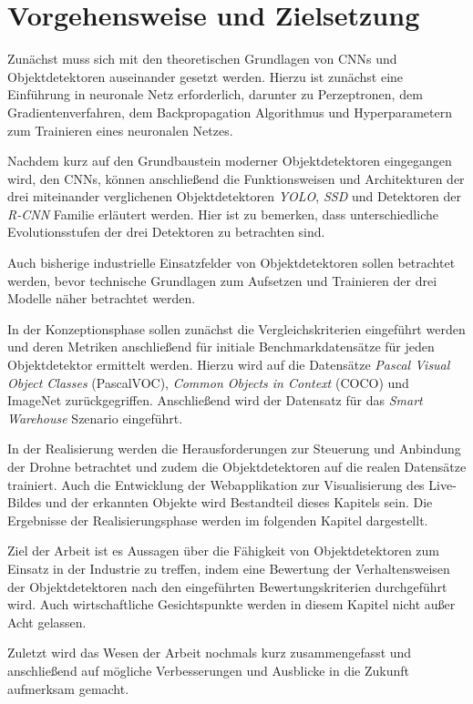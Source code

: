 \section{Vorgehensweise und Zielsetzung}


Zunächst muss sich mit den theoretischen Grundlagen von CNNs und Objektdetektoren auseinander gesetzt werden. Hierzu ist zunächst eine Einführung in neuronale Netz erforderlich, darunter zu Perzeptronen, dem Gradientenverfahren, dem Backpropagation Algorithmus und Hyperparametern zum Trainieren eines neuronalen Netzes. 

Nachdem kurz auf den Grundbaustein moderner Objektdetektoren eingegangen wird, den CNNs, können anschließend die Funktionsweisen und Architekturen der drei miteinander verglichenen Objektdetektoren \textit{YOLO}, \textit{SSD} und Detektoren der \textit{R-CNN} Familie erläutert werden. Hier ist zu bemerken, dass unterschiedliche Evolutionsstufen der drei Detektoren zu betrachten sind. 

Auch bisherige industrielle Einsatzfelder von Objektdetektoren sollen betrachtet werden, bevor technische Grundlagen zum Aufsetzen und Trainieren der drei Modelle näher betrachtet werden. 

In der Konzeptionsphase sollen zunächst die Vergleichskriterien eingeführt werden und deren Metriken anschließend für initiale Benchmarkdatensätze für jeden Objektdetektor ermittelt werden. Hierzu wird auf die Datensätze \textit{Pascal Visual Object Classes} (PascalVOC), \textit{Common Objects in Context} (COCO) und ImageNet zurückgegriffen. Anschließend wird der Datensatz für das \textit{Smart Warehouse} Szenario eingeführt. 

In der Realisierung werden die Herausforderungen zur Steuerung und Anbindung der Drohne betrachtet und zudem die Objektdetektoren auf die realen Datensätze trainiert. Auch die Entwicklung der Webapplikation zur Visualisierung des Live-Bildes und der erkannten Objekte wird Bestandteil dieses Kapitels sein. Die Ergebnisse der Realisierungsphase werden im folgenden Kapitel dargestellt. 

Ziel der Arbeit ist es Aussagen über die Fähigkeit von Objektdetektoren zum Einsatz in der Industrie zu treffen, indem eine Bewertung der Verhaltensweisen der Objektdetektoren nach den eingeführten Bewertungskriterien durchgeführt wird. Auch wirtschaftliche Gesichtspunkte werden in diesem Kapitel nicht außer Acht gelassen. 

Zuletzt wird das Wesen der Arbeit nochmals kurz zusammengefasst und anschließend auf mögliche Verbesserungen und Ausblicke in die Zukunft aufmerksam gemacht. 
